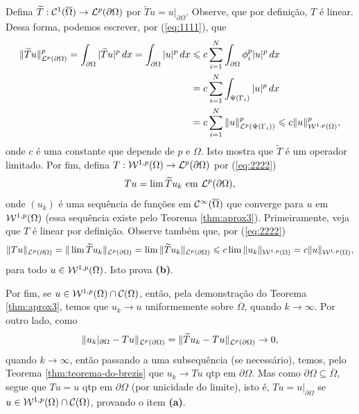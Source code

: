 \begin{prf}
    Defina $\widetilde T : \mathcal{C}^1(\overline \Omega) \to \mathcal{L}^p(\partial\Omega)$ por $\widetilde T u = u |_{\partial \Omega}$.
    Observe, que por definição, $T$ é linear.
    Dessa forma, podemos escrever, por (\ref{eq:1111}), que
    \begin{equation} \label{eq:2222}
        \begin{aligned}
            \Vert \widetilde Tu \Vert_{\mathcal{L}^p(\partial \Omega)}^p = \int_{\partial\Omega} | \widetilde T u|^p \,dx = \int_{\partial\Omega} |u|^p \,dx &\leqslant c \sum_{i=1}^{N} \int_{\partial \Omega} \phi_i^p |u|^p \,dx\\ 
            &= c \sum_{i=1}^N \int_{\Psi(\Gamma_i)} |u|^p \,dx\\ 
            &= c\sum_{i=1}^N \Vert u \Vert_{\mathcal{L}^p(\Psi(\Gamma_i))}^p \leqslant c\Vert u \Vert_{\mathcal{W}^{1,p}(\Omega)}^p,
        \end{aligned}
    \end{equation}
    onde $c$ é uma constante que depende de $p$ e $\Omega$. Isto mostra que $\widetilde T$ é um operador limitado.
    Por fim, defina $T : \mathcal{W}^{1,p}(\Omega) \to \mathcal{L}^p(\partial \Omega)$ por (\ref{eq:2222})
    \[
        T u = \lim \widetilde T u_k \text{ em } \mathcal{L}^p(\partial \Omega),
    \]
    onde $(u_k)$ é uma sequência de funções em $\mathcal{C}^{\infty}(\overline\Omega)$ que converge para $u$ em $\mathcal{W}^{1,p}(\Omega)$ (essa sequência existe pelo Teorema \ref{thm:aprox3}). 
    Primeiramente, veja que $T$ é linear por definição.
    Observe também que, por (\ref{eq:2222})
    \[
        \Vert Tu \Vert_{\mathcal{L}^p(\partial \Omega)} = \Vert \lim \widetilde T u_k \Vert_{\mathcal{L}^p(\partial \Omega)} = \lim \Vert \widetilde T u_k \Vert_{\mathcal{L}^p(\partial \Omega)} \leqslant c \lim \Vert u_k \Vert_{\mathcal{W}^{1,p}(\Omega)} = c \Vert u \Vert_{\mathcal{W}^{1,p}(\Omega)},
    \]
    para todo $u \in \mathcal{W}^{1,p}(\Omega)$. Isto prova \textbf{(b)}.

    Por fim, se $u \in \mathcal{W}^{1,p}(\Omega) \cap \mathcal{C}(\Omega)$, então, pela demonstração do Teorema \ref{thm:aprox3}, temos que $u_k \to u$ uniformemente sobre $\overline\Omega$, quando $k \to \infty$.
    Por outro lado, como
    \[
        \Vert u_k |_{\partial\Omega} - Tu \Vert_{\mathcal{L}^p(\partial \Omega)} = \Vert \widetilde T u_k - Tu \Vert_{\mathcal{L}^p(\partial\Omega)} \to 0,
    \]
    quando $k \to \infty$, então passando a uma subsequência (se necessário), temos, pelo Teorema \ref{thm:teorema-do-brezis} que $u_k \to Tu$ qtp em $\partial \Omega$.
    Mas como $\partial \Omega \subseteq \overline\Omega$, segue que $Tu = u$ qtp em $\partial \Omega$ (por unicidade do limite), isto é, $Tu = u|_{\partial\Omega}$ se $u \in \mathcal{W}^{1,p}(\Omega) \cap \mathcal{C}(\Omega)$, provando o item \textbf{(a)}.
\end{prf}

